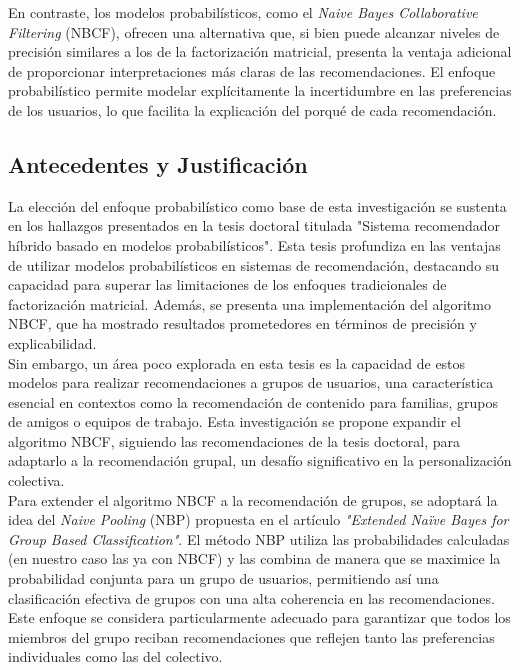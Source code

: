 \documentclass[twocolumn, fontsize=10pt]{article}
\begin{document}
En contraste, los modelos probabilísticos, 
como el \textit{Naive Bayes Collaborative Filtering} (NBCF), 
ofrecen una alternativa que, si bien puede alcanzar 
niveles de precisión similares a los de la 
factorización matricial, presenta la ventaja adicional 
de proporcionar interpretaciones más claras de las 
recomendaciones. El enfoque probabilístico permite 
modelar explícitamente la incertidumbre en las 
preferencias de los usuarios, lo que facilita la 
explicación del porqué de cada recomendación.

\subsection{Antecedentes y Justificación}

La elección del enfoque probabilístico como base de 
esta investigación se sustenta en los hallazgos 
presentados en la tesis doctoral titulada 
"Sistema recomendador híbrido basado en modelos 
probabilísticos". Esta tesis profundiza en las ventajas 
de utilizar modelos probabilísticos en sistemas de 
recomendación, destacando su capacidad para superar 
las limitaciones de los enfoques tradicionales de 
factorización matricial. Además, se presenta una 
implementación del algoritmo NBCF, que ha mostrado 
resultados prometedores en términos de precisión y 
explicabilidad.\\

Sin embargo, un área poco explorada en esta tesis es 
la capacidad de estos modelos para realizar 
recomendaciones a grupos de usuarios, una 
característica esencial en contextos como la 
recomendación de contenido para familias, grupos de 
amigos o equipos de trabajo. Esta investigación se 
propone expandir el algoritmo NBCF, siguiendo las 
recomendaciones de la tesis doctoral, para adaptarlo 
a la recomendación grupal, un desafío significativo 
en la personalización colectiva.\\

Para extender el algoritmo NBCF a la recomendación de 
grupos, se adoptará la idea del \textit{Naive Pooling} (NBP) 
propuesta en el artículo \textit{"Extended Naïve Bayes for 
Group Based Classification"}\cite{nbp}. El método NBP utiliza 
las probabilidades calculadas (en nuestro caso las ya 
con NBCF) y las 
combina de manera que se maximice la probabilidad 
conjunta para un grupo de usuarios, permitiendo así 
una clasificación efectiva de grupos con una alta 
coherencia en las recomendaciones. Este enfoque se 
considera particularmente adecuado para garantizar 
que todos los miembros del grupo reciban 
recomendaciones que reflejen tanto las preferencias 
individuales como las del colectivo.
\end{document}
